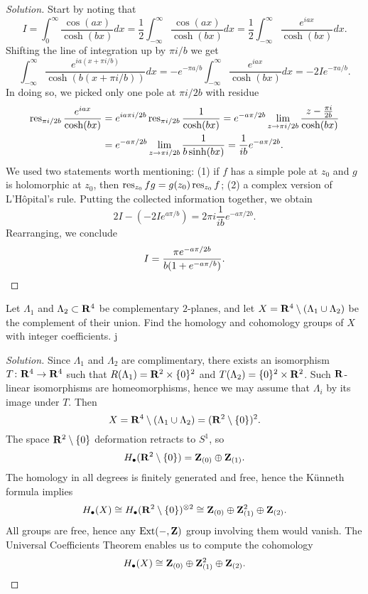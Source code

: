 \begin{proof}[Solution]
  Start by noting that
  \[
  I =
  \int_0^\infty \frac{\cos(a x)}{\cosh(b x)} d x =
  \frac{1}{2} \int_{-\infty}^\infty \frac{\cos(a x)}{\cosh(b x)} d x =
  \frac{1}{2} \int_{-\infty}^\infty \frac{e^{i a x}}{\cosh(b x)} d x.
  \]
  Shifting the line of integration up by $\pi i/b$ we get
  \[
  \int_{-\infty}^\infty \frac{e^{i a (x + \pi i/b)}}{\cosh(b(x + \pi i/b))} d x =
  - e^{-\pi a/b} \int_{-\infty}^\infty \frac{e^{i a x}}{\cosh(b x)} d x =
  - 2 I e^{-\pi a/b}.
  \]
  In doing so, we picked only one pole at $\pi i/2 b$ with residue
  \begin{align*}
    \operatorname{res}_{\pi i/2 b} \frac{e^{i a x}}{\cosh(b x)}
    &=
    e^{i a \pi i/2 b} \operatorname{res}_{\pi i/2 b} \frac{1}{\cosh(b x)} =
    e^{-a \pi/2 b} \lim_{z \rightarrow \pi i/2 b} \frac{z - \frac{\pi i}{2 b}}{\cosh(b x)} \\
    &=
    e^{-a \pi/2 b} \lim_{z \rightarrow \pi i/2 b} \frac{1}{b \sinh(b x)} =
    \frac{1}{i b} e^{-a \pi/2 b}.
  \end{align*}
  We used two statements worth mentioning: (1) if $f$ has a simple pole at $z_0$ and $g$ is holomorphic at $z_0$, then $\operatorname{res}_{z_0} f g = g(z_0) \operatorname{res}_{z_0} f$; (2) a complex version of L'H\^opital's rule. Putting the collected information together, we obtain
  \[
  2 I - \left( - 2 I e^{a \pi/ b} \right) = 2 \pi i \frac{1}{i b} e^{-a \pi/ 2 b}.
  \]
  Rearranging, we conclude
  \[
  I = \frac{\pi e^{- a \pi/2 b}}{b(1 + e^{- a \pi/b})}. \qedhere
  \]
\end{proof}


Let $\Lambda_1$ and $\Lambda_2 \subset \mathbf{R}^4$ be complementary $2$-planes, and let $X = \mathbf{R}^4 \setminus (\Lambda_1 \cup \Lambda_2)$ be the complement of their union. Find the homology and cohomology groups of $X$ with integer coefficients.
j
\begin{proof}[Solution]
  Since $\Lambda_1$ and $\Lambda_2$ are complimentary, there exists an isomorphism $T \colon \mathbf{R}^4 \rightarrow \mathbf{R}^4$ such that $R(\Lambda_1) = \mathbf{R}^2 \times \{0\}^2$ and $T(\Lambda_2) = \{0\}^2 \times \mathbf{R}^2$. Such $\mathbf{R}$-linear isomorphisms are homeomorphisms, hence we may assume that $\Lambda_i$ by its image under $T$. Then
  \[
  X = \mathbf{R}^4 \setminus (\Lambda_1 \cup \Lambda_2) = (\mathbf{R}^2 \setminus \{0\})^2.
  \]
  The space $\mathbf{R}^2 \setminus \{0\}$ deformation retracts to $S^1$, so
  \[
  H_\bullet(\mathbf{R}^2 \setminus \{0\}) = \mathbf{Z}_{(0)} \oplus \mathbf{Z}_{(1)}.
  \]
  The homology in all degrees is finitely generated and free, hence the K\"unneth formula implies
  \[
  H_\bullet(X) \cong
  H_\bullet(\mathbf{R}^2 \setminus \{0\})^{\otimes 2} \cong
  \mathbf{Z}_{(0)} \oplus \mathbf{Z}_{(1)}^2 \oplus \mathbf{Z}_{(2)}.
  \]
  All groups are free, hence any $\operatorname{Ext}(-,\mathbf{Z})$ group involving them would vanish. The Universal Coefficients Theorem enables us to compute the cohomology
  \[
  H_\bullet(X) \cong \mathbf{Z}_{(0)} \oplus \mathbf{Z}_{(1)}^2 \oplus \mathbf{Z}_{(2)}. \qedhere
  \]
\end{proof}

